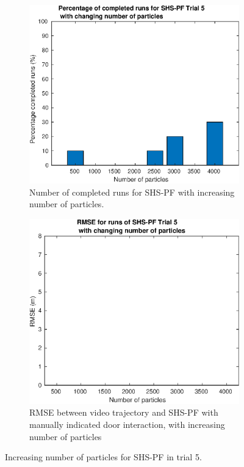 \begin{figure}[H]
	\centering
	\begin{subfigure}[t]{.4\textwidth}
		\centering
		\includegraphics[width=\linewidth]{images/20201201_1625_Trial_5_nr_particles_1}
		\caption{Number of completed runs for SHS-PF with increasing number of particles.}
		\label{fig:trial5_nr_particles_completed}
	\end{subfigure} \quad
	\begin{subfigure}[t]{.4\textwidth}
		\centering
		\includegraphics[width=\linewidth]{images/20201201_1622_Trial_5_RMSE_nr_particles_1}
		\caption{RMSE between video trajectory and SHS-PF with manually indicated door interaction, with increasing number of particles}
		\label{fig:trial5_nr_particles_RMSE}
	\end{subfigure}
	\label{fig:trial5_nr_particles}
	\caption{Increasing number of particles for SHS-PF in trial 5.}
\end{figure}

